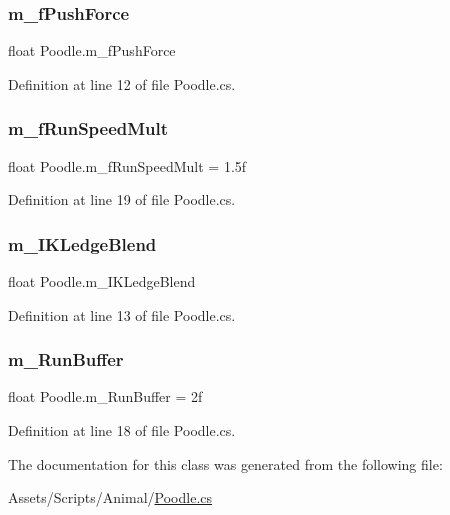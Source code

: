 \subsubsection{\texorpdfstring{m\+\_\+f\+Push\+Force}{m\_fPushForce}}
{\footnotesize\ttfamily float Poodle.\+m\+\_\+f\+Push\+Force}



Definition at line 12 of file Poodle.\+cs.

\mbox{\label{class_poodle_acba2d379c3793b44fda2ea6b5dc45202}} 
\subsubsection{\texorpdfstring{m\+\_\+f\+Run\+Speed\+Mult}{m\_fRunSpeedMult}}
{\footnotesize\ttfamily float Poodle.\+m\+\_\+f\+Run\+Speed\+Mult = 1.\+5f}



Definition at line 19 of file Poodle.\+cs.

\mbox{\label{class_poodle_a09afc8011fdd8762fe83e4c56796d75a}} 
\subsubsection{\texorpdfstring{m\+\_\+\+I\+K\+Ledge\+Blend}{m\_IKLedgeBlend}}
{\footnotesize\ttfamily float Poodle.\+m\+\_\+\+I\+K\+Ledge\+Blend}



Definition at line 13 of file Poodle.\+cs.

\mbox{\label{class_poodle_a673508ffb04736432dbacf012f3ca0ef}} 
\subsubsection{\texorpdfstring{m\+\_\+\+Run\+Buffer}{m\_RunBuffer}}
{\footnotesize\ttfamily float Poodle.\+m\+\_\+\+Run\+Buffer = 2f}



Definition at line 18 of file Poodle.\+cs.



The documentation for this class was generated from the following file\+:\begin{DoxyCompactItemize}
\item 
Assets/\+Scripts/\+Animal/\mbox{\hyperlink{_poodle_8cs}{Poodle.\+cs}}\end{DoxyCompactItemize}
